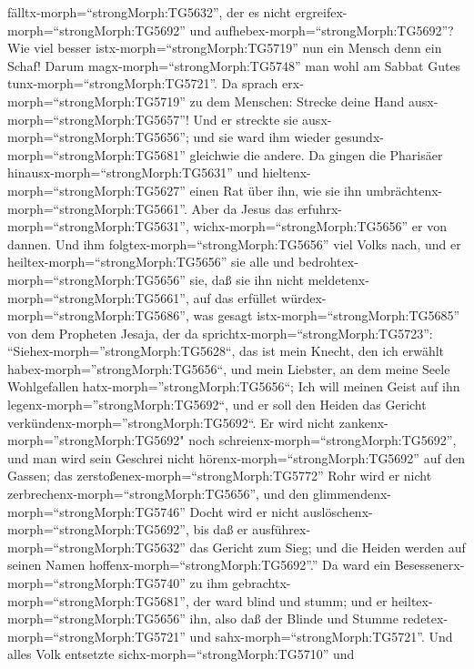fälltx-morph=``strongMorph:TG5632'', der es nicht
ergreifex-morph=``strongMorph:TG5692'' und
aufhebex-morph=``strongMorph:TG5692''?  Wie viel besser
istx-morph=``strongMorph:TG5719'' nun ein Mensch denn ein Schaf! Darum
magx-morph=``strongMorph:TG5748'' man wohl am Sabbat Gutes
tunx-morph=``strongMorph:TG5721''.  Da sprach
erx-morph=``strongMorph:TG5719'' zu dem Menschen: Strecke deine Hand
ausx-morph=``strongMorph:TG5657''! Und er streckte sie
ausx-morph=``strongMorph:TG5656''; und sie ward ihm wieder
gesundx-morph=``strongMorph:TG5681'' gleichwie die andere. 
Da gingen die Pharisäer hinausx-morph=``strongMorph:TG5631'' und
hieltenx-morph=``strongMorph:TG5627'' einen Rat über ihn, wie sie ihn
umbrächtenx-morph=``strongMorph:TG5661''.  Aber da Jesus
das erfuhrx-morph=``strongMorph:TG5631'',
wichx-morph=``strongMorph:TG5656'' er von dannen. Und ihm
folgtex-morph=``strongMorph:TG5656'' viel Volks nach, und er
heiltex-morph=``strongMorph:TG5656'' sie alle  und
bedrohtex-morph=``strongMorph:TG5656'' sie, daß sie ihn nicht
meldetenx-morph=``strongMorph:TG5661'',  auf das erfüllet
würdex-morph=``strongMorph:TG5686'', was gesagt
istx-morph=``strongMorph:TG5685'' von dem Propheten Jesaja, der da
sprichtx-morph=``strongMorph:TG5723'': 
``Siehex-morph=''strongMorph:TG5628``, das ist mein Knecht, den ich
erwählt habex-morph=''strongMorph:TG5656``, und mein Liebster, an dem
meine Seele Wohlgefallen hatx-morph=''strongMorph:TG5656``; Ich will
meinen Geist auf ihn legenx-morph=''strongMorph:TG5692``, und er soll
den Heiden das Gericht verkündenx-morph=''strongMorph:TG5692``.
 Er wird nicht zankenx-morph=''strongMorph:TG5692" noch
schreienx-morph=``strongMorph:TG5692'', und man wird sein Geschrei nicht
hörenx-morph=``strongMorph:TG5692'' auf den Gassen;  das
zerstoßenex-morph=``strongMorph:TG5772'' Rohr wird er nicht
zerbrechenx-morph=``strongMorph:TG5656'', und den
glimmendenx-morph=``strongMorph:TG5746'' Docht wird er nicht
auslöschenx-morph=``strongMorph:TG5692'', bis daß er
ausführex-morph=``strongMorph:TG5632'' das Gericht zum Sieg;
 und die Heiden werden auf seinen Namen
hoffenx-morph=``strongMorph:TG5692''.''  Da ward ein
Besessenerx-morph=``strongMorph:TG5740'' zu ihm
gebrachtx-morph=``strongMorph:TG5681'', der ward blind und stumm; und er
heiltex-morph=``strongMorph:TG5656'' ihn, also daß der Blinde und Stumme
redetex-morph=``strongMorph:TG5721'' und
sahx-morph=``strongMorph:TG5721''.  Und alles Volk
entsetzte sichx-morph=``strongMorph:TG5710'' und
